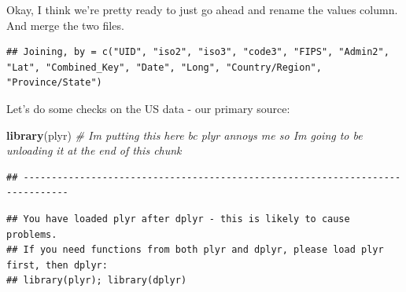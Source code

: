 \documentclass[
]{article}
\newenvironment{Shaded}{\begin{snugshade}}{\end{snugshade}}
\newcommand{\CommentTok}[1]{\textcolor[rgb]{0.56,0.35,0.01}{\textit{#1}}}
\newcommand{\DataTypeTok}[1]{\textcolor[rgb]{0.13,0.29,0.53}{#1}}
\newcommand{\KeywordTok}[1]{\textcolor[rgb]{0.13,0.29,0.53}{\textbf{#1}}}
\newcommand{\NormalTok}[1]{#1}
\newcommand{\OperatorTok}[1]{\textcolor[rgb]{0.81,0.36,0.00}{\textbf{#1}}}
\newcommand{\StringTok}[1]{\textcolor[rgb]{0.31,0.60,0.02}{#1}}
\begin{document}
Okay, I think we're pretty ready to just go ahead and rename the values
column. And merge the two files.

\begin{Shaded}
\end{Shaded}

\begin{verbatim}
## Joining, by = c("UID", "iso2", "iso3", "code3", "FIPS", "Admin2", "Lat", "Combined_Key", "Date", "Long", "Country/Region", "Province/State")
\end{verbatim}

Let's do some checks on the US data - our primary source:

\begin{Shaded}
\begin{Highlighting}[]
\KeywordTok{library}\NormalTok{(plyr) }\CommentTok{# Im putting this here bc plyr annoys me so Im going to be unloading it at the end of this chunk }
\end{Highlighting}
\end{Shaded}

\begin{verbatim}
## ------------------------------------------------------------------------------
\end{verbatim}

\begin{verbatim}
## You have loaded plyr after dplyr - this is likely to cause problems.
## If you need functions from both plyr and dplyr, please load plyr first, then dplyr:
## library(plyr); library(dplyr)
\end{verbatim}
\end{document}
